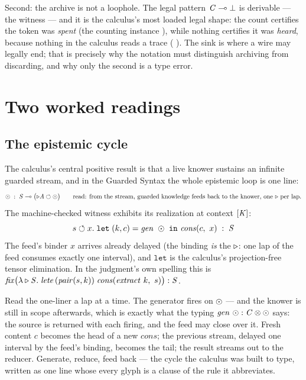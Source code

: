\documentclass{eptcs}
\begin{document}
Second: the archive is not a loophole. The legal pattern
$\mathit{C} \multimap \bot$ is derivable --- the witness
  --- and it is the
calculus's most loaded legal shape: the count certifies the token was
\emph{spent} (the counting instance 
), while nothing certifies it was \emph{heard},
because nothing in the calculus reads a trace
( ). The sink is
where a wire may legally end; that is precisely why the notation must
distinguish archiving from discarding, and why only the second is a type error.

\section{Two worked readings}\label{sec:worked}

\subsection{The epistemic cycle}\label{sec:worked:cycle}

The calculus's central positive result is that a live knower sustains
an infinite guarded stream, and in the Guarded Syntax the whole
epistemic loop is one line:
\[
\odot \;:\; \mathit{S} \multimap \bigl(\triangleright\mathit{A} \circlearrowleft \odot\bigr)
\qquad\text{read: from the stream, guarded knowledge feeds back to the
knower, one $\triangleright$ per lap.}
\]
The machine-checked witness 
 exhibits its realization at context $[\mathit{K}]$:
\[
s \circlearrowleft x.\;\texttt{let}\;(k,c) = \mathit{gen}\ \odot\ \texttt{in}\
  \mathit{cons}(c,\ x) \;:\; \mathit{S}
\]
The feed's binder $x$ arrives already delayed (the binding \emph{is}
the $\triangleright$: one lap of the feed consumes exactly one interval), and
$\texttt{let}$ is the calculus's projection-free tensor elimination.
In the judgment's own spelling this is
$\mathit{fix}\bigl(\lambda \triangleright\mathit{S}.\;
\mathit{lete}\,(\mathit{pair}(s,k))\;
\mathit{cons}(\mathit{extract}\ k,\ s)\bigr) : \mathit{S}$.

Read the one-liner a lap at a time. The generator fires on $\odot$
--- and the knower is still in scope afterwards, which is exactly what
the typing $\mathit{gen}\ \odot : \mathit{C} \otimes \odot$ says: the
source is returned with each firing, and the feed may close over it.
Fresh content $c$ becomes the head of a new $\mathit{cons}$; the
previous stream, delayed one interval by the feed's binding, becomes
the tail; the result streams out to the reducer. Generate, reduce,
feed back --- the cycle the calculus was built to type, written as one
line whose every glyph is a clause of the rule it abbreviates.
\end{document}

